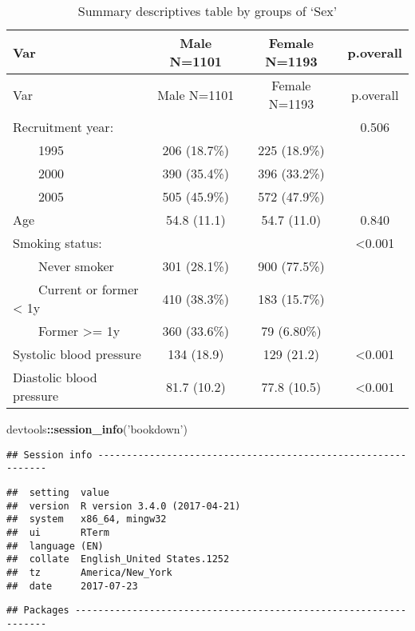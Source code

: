 \documentclass[]{article}
\newenvironment{Shaded}{\begin{snugshade}}{\end{snugshade}}
\newcommand{\KeywordTok}[1]{\textcolor[rgb]{0.13,0.29,0.53}{\textbf{#1}}}
\newcommand{\StringTok}[1]{\textcolor[rgb]{0.31,0.60,0.02}{#1}}
\newcommand{\OperatorTok}[1]{\textcolor[rgb]{0.81,0.36,0.00}{\textbf{#1}}}
\newcommand{\NormalTok}[1]{#1}
\begin{document}
\begin{longtable}[]{@{}lccc@{}}
\caption{\label{tab:md-output}Summary descriptives table by groups of
`Sex'}\tabularnewline
\toprule
Var & Male N=1101 & Female N=1193 & p.overall\tabularnewline
\midrule
\endfirsthead
\toprule
Var & Male N=1101 & Female N=1193 & p.overall\tabularnewline
\midrule
\endhead
Recruitment year: & & & 0.506\tabularnewline
~~~~1995 & 206 (18.7\%) & 225 (18.9\%) &\tabularnewline
~~~~2000 & 390 (35.4\%) & 396 (33.2\%) &\tabularnewline
~~~~2005 & 505 (45.9\%) & 572 (47.9\%) &\tabularnewline
Age & 54.8 (11.1) & 54.7 (11.0) & 0.840\tabularnewline
Smoking status: & & & \textless{}0.001\tabularnewline
~~~~Never smoker & 301 (28.1\%) & 900 (77.5\%) &\tabularnewline
~~~~Current or former \textless{} 1y & 410 (38.3\%) & 183 (15.7\%)
&\tabularnewline
~~~~Former \textgreater{}= 1y & 360 (33.6\%) & 79 (6.80\%)
&\tabularnewline
Systolic blood pressure & 134 (18.9) & 129 (21.2) &
\textless{}0.001\tabularnewline
Diastolic blood pressure & 81.7 (10.2) & 77.8 (10.5) &
\textless{}0.001\tabularnewline
\bottomrule
\end{longtable}

\begin{Shaded}
\begin{Highlighting}[]
\NormalTok{devtools}\OperatorTok{::}\KeywordTok{session_info}\NormalTok{(}\StringTok{'bookdown'}\NormalTok{)}
\end{Highlighting}
\end{Shaded}

\begin{verbatim}
## Session info -------------------------------------------------------------
\end{verbatim}

\begin{verbatim}
##  setting  value                       
##  version  R version 3.4.0 (2017-04-21)
##  system   x86_64, mingw32             
##  ui       RTerm                       
##  language (EN)                        
##  collate  English_United States.1252  
##  tz       America/New_York            
##  date     2017-07-23
\end{verbatim}

\begin{verbatim}
## Packages -----------------------------------------------------------------
\end{verbatim}
\end{document}
